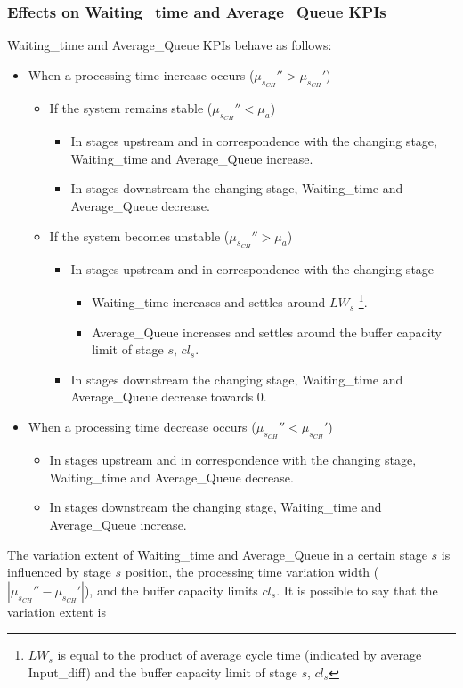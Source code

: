 \subsubsection{Effects on Waiting\_time and Average\_Queue KPIs}
Waiting\_time and Average\_Queue KPIs behave as follows:
\begin{itemize}
\item When a processing time increase occurs ($\mu_{s_{CH}}''>\mu_{s_{CH}}'$)
\begin{itemize}
\item If the system remains stable ($\mu_{s_{CH}}''<\mu_a$)
\begin{itemize}
\item In stages upstream and in correspondence with the changing stage, Waiting\_time and Average\_Queue increase.
\item In stages downstream the changing stage, Waiting\_time and Average\_Queue decrease.
\end{itemize}
\item If the system becomes unstable ($\mu_{s_{CH}}''>\mu_a$)
\begin{itemize}
\item In stages upstream and in correspondence with the changing stage
\begin{itemize}
\item Waiting\_time increases and settles around $LW_s$ \footnote{$LW_s$ is equal to the product of average cycle time (indicated by average Input\_diff) and the buffer capacity limit of stage $s$, $cl_s$}.
\item Average\_Queue increases and settles around the buffer capacity limit of stage $s$, $cl_s$.
\end{itemize}
\item In stages downstream the changing stage, Waiting\_time and Average\_Queue decrease towards $0$.
\end{itemize}
\end{itemize}
\item When a processing time decrease occurs ($\mu_{s_{CH}}''<\mu_{s_{CH}}'$)
\begin{itemize}
\item In stages upstream and in correspondence with the changing stage, Waiting\_time and Average\_Queue decrease.
\item In stages downstream the changing stage, Waiting\_time and Average\_Queue increase.
\end{itemize}
\end{itemize}
The variation extent of Waiting\_time and Average\_Queue in a certain stage $s$ is influenced by stage $s$ position, the processing time variation width ($|\mu_{s_{CH}}''-\mu_{s_{CH}}'|$), and the buffer capacity limits $cl_s$. It is possible to say that the variation extent is 
